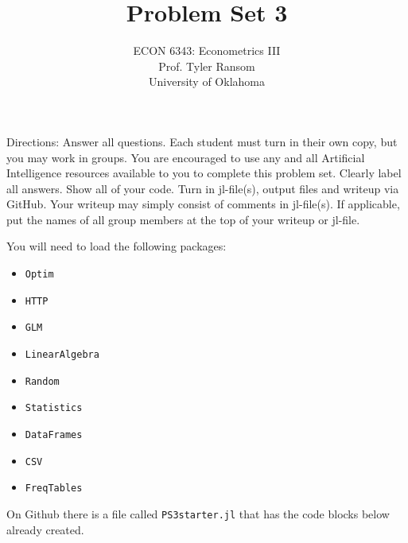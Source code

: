 \documentclass[12pt,english]{article}
\begin{document}
\title{Problem Set 3}
\author{ECON 6343: Econometrics III\\
Prof. Tyler Ransom\\
University of Oklahoma}
\date{}%

\maketitle
Directions: Answer all questions. Each student must turn in their own copy, but you may work in groups. You are encouraged to use any and all Artificial Intelligence resources available to you to complete this problem set. Clearly label all answers. Show all of your code. Turn in jl-file(s), output files and writeup via GitHub. Your writeup may simply consist of comments in jl-file(s). If applicable, put the names of all group members at the top of your writeup or jl-file.

You will need to load the following packages:
\begin{itemize}
    \item[~] \texttt{Optim} 
    \item[~] \texttt{HTTP} 
    \item[~] \texttt{GLM} 
    \item[~] \texttt{LinearAlgebra} 
    \item[~] \texttt{Random} 
    \item[~] \texttt{Statistics} 
    \item[~] \texttt{DataFrames} 
    \item[~] \texttt{CSV} 
    \item[~] \texttt{FreqTables}
\end{itemize}

On Github there is a file called \texttt{PS3starter.jl} that has the code blocks below already created.
\end{document}
